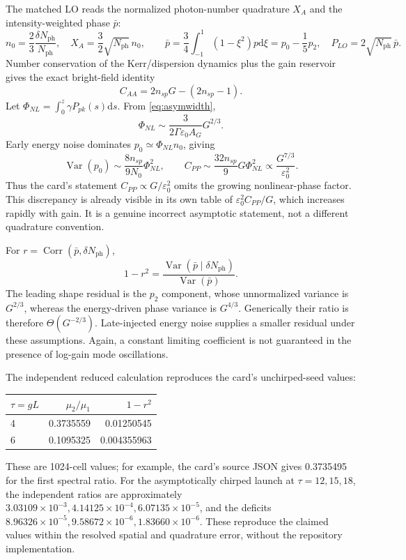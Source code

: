 \documentclass[11pt,a4paper]{article}
\newcommand{\dd}{\mathrm d}
\newcommand{\Var}{\operatorname{Var}}
\newcommand{\Nph}{N_{\mathrm{ph}}}
\newcommand{\eps}{\varepsilon}
\begin{document}
The matched LO reads the normalized photon-number quadrature $X_A$ and the intensity-weighted phase $\bar p$:
\begin{equation}
n_0=\frac23\frac{\delta\Nph}{\Nph},\quad
X_A=\frac32\sqrt{\Nph}\,n_0,\qquad
\bar p=\frac34\int_{-1}^1(1-\xi^2)p\dd\xi=p_0-\frac15p_2,\quad
P_{LO}=2\sqrt{\Nph}\,\bar p.
\end{equation}
Number conservation of the Kerr/dispersion dynamics plus the gain reservoir gives the exact bright-field identity
\begin{equation}
C_{AA}=2n_{sp}G-(2n_{sp}-1).
\end{equation}
Let $\Phi_{NL}=\int_0^z\gamma P_{pk}(s)\dd s$. From \eqref{eq:asymwidth},
\begin{equation}
\Phi_{NL}\sim\frac{3}{2\Gamma\eps_0 A_G}G^{2/3}.
\end{equation}
Early energy noise dominates $p_0\simeq\Phi_{NL}n_0$, giving
\begin{equation}
\Var(p_0)\sim\frac{8n_{sp}}{9N_0}\Phi_{NL}^2,\qquad
\boxed{C_{PP}\sim\frac{32n_{sp}}9G\Phi_{NL}^2\propto\frac{G^{7/3}}{\eps_0^2}.}
\end{equation}
Thus the card's statement $C_{PP}\propto G/\eps_0^2$ omits the growing nonlinear-phase factor. This discrepancy is already visible in its own table of $\eps_0^2 C_{PP}/G$, which increases rapidly with gain. It is a genuine incorrect asymptotic statement, not a different quadrature convention.

For $r=\operatorname{Corr}(\bar p,\delta\Nph)$,
\begin{equation}
1-r^2=\frac{\Var(\bar p\mid\delta\Nph)}{\Var(\bar p)}.
\end{equation}
The leading shape residual is the $p_2$ component, whose unnormalized variance is $G^{2/3}$, whereas the energy-driven phase variance is $G^{4/3}$. Generically their ratio is therefore $\Theta(G^{-2/3})$. Late-injected energy noise supplies a smaller residual under these assumptions. Again, a constant limiting coefficient is not guaranteed in the presence of log-gain mode oscillations.

The independent reduced calculation reproduces the card's unchirped-seed values:
\begin{center}
\begin{tabular}{@{}lrr@{}}\toprule
$\tau=gL$ & $\mu_2/\mu_1$ & $1-r^2$ \\\midrule
4 & 0.3735559 & 0.01250545 \\
6 & 0.1095325 & 0.004355963 \\\bottomrule
\end{tabular}
\end{center}
These are 1024-cell values; for example, the card's source JSON gives 0.3735495 for the first spectral ratio. For the asymptotically chirped launch at $\tau=12,15,18$, the independent ratios are approximately $3.03109\times10^{-3},4.14125\times10^{-4},6.07135\times10^{-5}$, and the deficits $8.96326\times10^{-5},9.58672\times10^{-6},1.83660\times10^{-6}$. These reproduce the claimed values within the resolved spatial and quadrature error, without the repository implementation.
\end{document}
